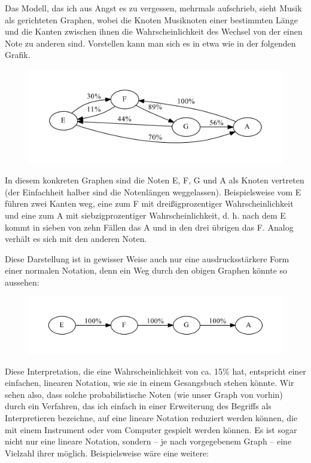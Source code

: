\documentclass[a4paper,twocolumn]{article}
\begin{document}
Das Modell, das ich aus Angst es zu vergessen, mehrmals aufschrieb,
sieht Musik als gerichteten Graphen, wobei die Knoten Musiknoten einer
bestimmten Länge und die Kanten zwischen ihnen die Wahrscheinlichkeit des
Wechsel von der einen Note zu anderen sind. Vorstellen kann man sich es in etwa wie
in der folgenden Grafik.

\begin{figure}[h]
\includegraphics[width=.5\textwidth]{example-graph}
\end{figure}

In diesem konkreten Graphen sind die Noten E, F, G und A als Knoten vertreten
(der Einfachheit halber sind die Notenlängen weggelassen). Beispielsweise vom E
führen zwei Kanten weg, eine zum F mit dreißigprozentiger Wahrscheinlichkeit und
eine zum A mit siebzigprozentiger Wahrscheinlichkeit, d. h. nach dem E kommt in
sieben von zehn Fällen das A und in den drei übrigen das F. Analog verhält
es sich mit den anderen Noten.

Diese Darstellung ist in gewisser Weise auch nur eine ausdrucksstärkere Form
einer normalen Notation, denn ein Weg durch den obigen
Graphen könnte so aussehen:

\begin{figure}[h]
\includegraphics[width=.5\textwidth]{example-graph-interpretation}
\end{figure}

Diese Interpretation, die eine Wahrscheinlichkeit von ca. 15\% hat,
entspricht einer einfachen, linearen Notation, wie sie in einem Gesangsbuch
stehen könnte. Wir sehen also, dass solche probabilistische Noten (wie unser
Graph von vorhin) durch ein Verfahren, das ich einfach in einer Erweiterung des
Begriffs als Interpretieren bezeichne, auf eine lineare Notation reduziert
werden können, die mit einem Instrument oder vom Computer gespielt werden können. Es
ist sogar nicht nur eine lineare Notation, sondern -- je nach vorgegebenem Graph
-- eine Vielzahl ihrer möglich. Beispielsweise wäre eine weitere:
\end{document}
